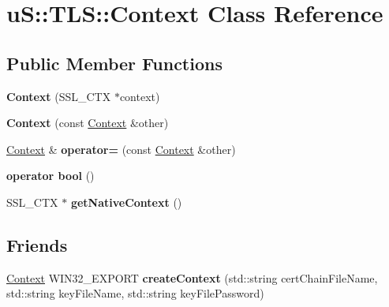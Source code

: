 \hypertarget{classu_s_1_1_t_l_s_1_1_context}{}\section{uS\+:\+:T\+LS\+:\+:Context Class Reference}
\label{classu_s_1_1_t_l_s_1_1_context}
\subsection*{Public Member Functions}
\begin{DoxyCompactItemize}
\item 
\mbox{\label{classu_s_1_1_t_l_s_1_1_context_a702af2c429c5f13e4021c73cf8a93a6b}} 
{\bfseries Context} (S\+S\+L\+\_\+\+C\+TX $\ast$context)
\item 
\mbox{\label{classu_s_1_1_t_l_s_1_1_context_af64c428416d44616a86107eed00b7bfe}} 
{\bfseries Context} (const \mbox{\hyperlink{classu_s_1_1_t_l_s_1_1_context}{Context}} \&other)
\item 
\mbox{\label{classu_s_1_1_t_l_s_1_1_context_a7300e69e25c354668c9132155928b42c}} 
\mbox{\hyperlink{classu_s_1_1_t_l_s_1_1_context}{Context}} \& {\bfseries operator=} (const \mbox{\hyperlink{classu_s_1_1_t_l_s_1_1_context}{Context}} \&other)
\item 
\mbox{\label{classu_s_1_1_t_l_s_1_1_context_ab833164f82631ae639c974ad4b12994d}} 
{\bfseries operator bool} ()
\item 
\mbox{\label{classu_s_1_1_t_l_s_1_1_context_ac85232327f5e0f8e2204a543aee8a82a}} 
S\+S\+L\+\_\+\+C\+TX $\ast$ {\bfseries get\+Native\+Context} ()
\end{DoxyCompactItemize}
\subsection*{Friends}
\begin{DoxyCompactItemize}
\item 
\mbox{\label{classu_s_1_1_t_l_s_1_1_context_a2c9899e5f3a88910e7826091a7e1de2e}} 
\mbox{\hyperlink{classu_s_1_1_t_l_s_1_1_context}{Context}} W\+I\+N32\+\_\+\+E\+X\+P\+O\+RT {\bfseries create\+Context} (std\+::string cert\+Chain\+File\+Name, std\+::string key\+File\+Name, std\+::string key\+File\+Password)
\end{DoxyCompactItemize}


